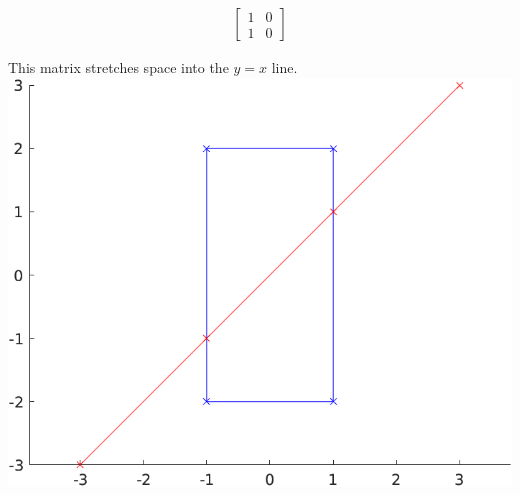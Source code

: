 \begin{align*}
    \begin{bmatrix}
        1 & 0 \\
        1 & 0
    \end{bmatrix}
\end{align*}

\begin{solution}
This matrix stretches space into the $y=x$ line.\\
\includegraphics{img/e2p2b.png}
\end{solution}